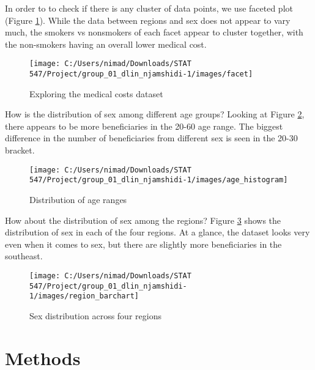 \documentclass[
]{article}
\begin{document}
In order to to check if there is any cluster of data points, we use faceted plot (Figure \ref{fig:facet-png}). While the data between regions and sex does not appear to vary much, the smokers vs nonsmokers of each facet appear to cluster together, with the non-smokers having an overall lower medical cost.

\begin{figure}

{\centering \texttt{[image: C:/Users/nimad/Downloads/STAT 547/Project/group\_01\_dlin\_njamshidi-1/images/facet]} 

}

\caption{Exploring the medical costs dataset}\label{fig:facet-png}
\end{figure}

How is the distribution of sex among different age groups?
Looking at Figure \ref{fig:agehist-png}, there appears to be more beneficiaries in the 20-60 age range. The biggest difference in the number of beneficiaries from different sex is seen in the 20-30 bracket.

\begin{figure}

{\centering \texttt{[image: C:/Users/nimad/Downloads/STAT 547/Project/group\_01\_dlin\_njamshidi-1/images/age\_histogram]} 

}

\caption{Distribution of age ranges}\label{fig:agehist-png}
\end{figure}

How about the distribution of sex among the regions?
Figure \ref{fig:barplot-png} shows the distribution of sex in each of the four regions. At a glance, the dataset looks very even when it comes to sex, but there are slightly more beneficiaries in the southeast.

\begin{figure}

{\centering \texttt{[image: C:/Users/nimad/Downloads/STAT 547/Project/group\_01\_dlin\_njamshidi-1/images/region\_barchart]} 

}

\caption{Sex distribution across four regions}\label{fig:barplot-png}
\end{figure}

\hypertarget{methods}{%
\section{Methods}\label{methods}}
\end{document}
